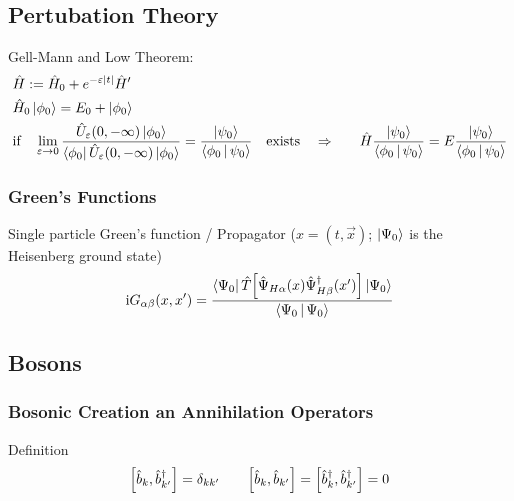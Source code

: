 
	\subsection{Pertubation Theory}
		Gell-Mann and Low Theorem:
		\begin{equation}
			\begin{aligned}
				&\hat{H} := \hat{H}_0 + e^{-\varepsilon \abs{t}} \hat{H}' \\
				&\hat{H}_0 \Ket{\phi_0} = E_0 + \Ket{\phi_0} \\
				&\text{if}\quad \lim_{\varepsilon\rightarrow 0} \frac{\hat{U}_\varepsilon(0,-\infty)\Ket{\phi_0}}{\Bra{\phi_0} \hat{U}_\varepsilon(0,-\infty)\Ket{\phi_0}}
				= \frac{\Ket{\psi_0}}{\Braket{\phi_0|\psi_0}} \quad\text{exists}\quad
				\Rightarrow&\quad \hat{H} \frac{\Ket{\psi_0}}{\Braket{\phi_0|\psi_0}} = E \frac{\Ket{\psi_0}}{\Braket{\phi_0|\psi_0}} \\
			\end{aligned}
		\end{equation}

		\subsubsection{Green's Functions}
			Single particle Green's function / Propagator  ($x=(t,\vec{x})$; $\Ket{\Psi_0}$ is the Heisenberg ground state)
			\begin{equation}
				\begin{aligned}
					\mathrm{i} G_{\alpha\beta}(x, x') &= \frac{\Bra{\Psi_0} \hat{T}\qty[\hat{\Psi}_{H\alpha}(x)\hat{\Psi}^\dagger_{H\beta}(x')] \Ket{\Psi_0}}{\Braket{\Psi_0|\Psi_0}} \\					
				\end{aligned}
			\end{equation}


	\subsection{Bosons}
		\subsubsection{Bosonic Creation an Annihilation Operators}
		\label{Sec:BosonicCreationAndAnnihilationOperators}
			Definition
			\begin{equation}
				\comm{\hat{b}_k}{\hat{b}_{k'}^\dagger} = \delta_{kk'}
				\hspace{20pt}
				\comm{\hat{b}_k}{\hat{b}_{k'}} = \comm{\hat{b}_k^\dagger}{\hat{b}_{k'}^\dagger} = 0
			\end{equation}

